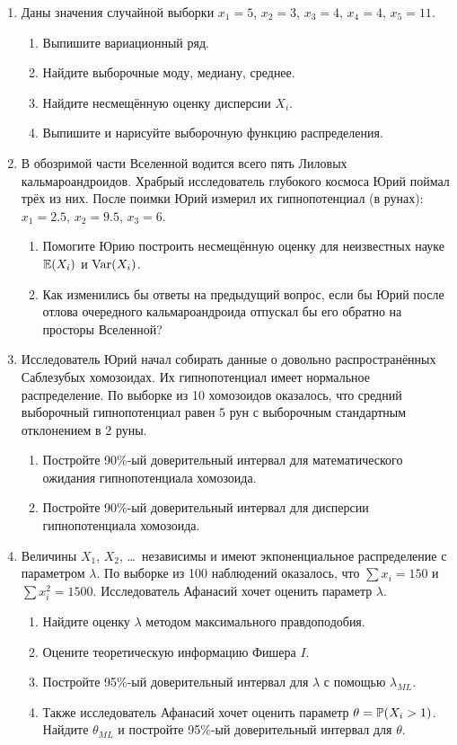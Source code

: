 \documentclass[12pt, a4paper]{article}\usepackage[]{graphicx}\usepackage[]{color}
\begin{document}
						\begin{enumerate}
							\item  Даны значения случайной выборки $x_1=5$, $x_2=3$, $x_3=4$, $x_4=4$, $x_5=11$.
							\begin{enumerate}
								\item Выпишите вариационный ряд.
								\item	Найдите выборочные моду, медиану, среднее.
								\item Найдите несмещённую оценку дисперсии $X_i$.
								\item Выпишите и нарисуйте выборочную функцию распределения.
							\end{enumerate}

							\item В обозримой части Вселенной водится всего пять Лиловых кальмароандроидов. Храбрый исследователь глубокого космоса Юрий поймал трёх из них. После поимки Юрий измерил их гипнопотенциал (в рунах): $x_1 = 2.5$, $x_2 = 9.5$, $x_3 = 6$.
							\begin{enumerate}
								\item Помогите Юрию построить несмещённую оценку для неизвестных науке $\E(X_i)$ и $\Var(X_i)$.
								\item Как изменились бы ответы на предыдущий вопрос, если бы Юрий после отлова очередного кальмароандроида отпускал бы его обратно на просторы Вселенной?
							\end{enumerate}

							\item Исследователь Юрий начал собирать данные о довольно распространённых Саблезубых хомозоидах. Их гипнопотенциал имеет нормальное распределение. По выборке из 10 хомозоидов оказалось, что средний выборочный гипнопотенциал равен 5 рун с выборочным стандартным отклонением в 2 руны.
							\begin{enumerate}
								\item Постройте 90\%-ый доверительный интервал для математического ожидания гипнопотенциала хомозоида.
								\item Постройте 90\%-ый доверительный интервал для дисперсии гипнопотенциала хомозоида.
							\end{enumerate}


							\item   Величины $X_1$, $X_2$, \ldots~независимы и имеют экпоненциальное распределение с параметром $\lambda$. По выборке из 100 наблюдений оказалось, что $\sum x_i = 150$ и $\sum x_i^2 = 1500$. Исследователь Афанасий хочет оценить параметр $\lambda$.
							\begin{enumerate}
								\item Найдите оценку $\lambda$ методом максимального правдоподобия.
								\item Оцените теоретическую информацию Фишера $I$.
								\item Постройте 95\%-ый доверительный интервал для $\lambda$ с помощью $\lambda_{ML}$.
								\item Также исследователь Афанасий хочет оценить параметр $\theta = \P(X_i > 1)$. Найдите $\theta_{ML}$ и постройте 95\%-ый доверительный интервал для $\theta$.
							\end{enumerate}



\end{enumerate}
\end{document}
